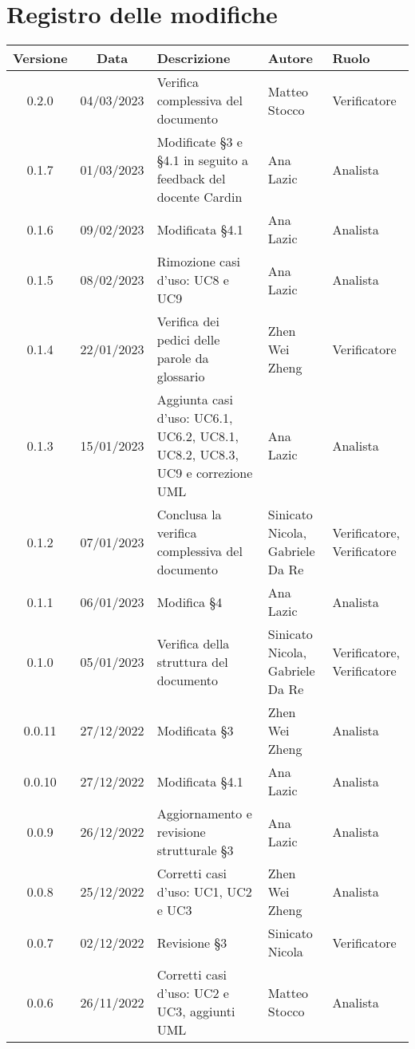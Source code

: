 \section*{Registro delle modifiche}
\begin{center}
\begin{tabularx}{\textwidth}{| c | c | X | X | X |} 
	\hline
	\rowcolor{white}
	\textbf{Versione} & \textbf{Data} & \textbf{Descrizione} & \textbf{Autore} & \textbf{Ruolo}\\
	\hline
	0.2.0 & 04/03/2023 & Verifica complessiva del documento & Matteo Stocco & Verificatore \\
 	\hline
	0.1.7 & 01/03/2023 & Modificate §3 e §4.1 in seguito a feedback del docente Cardin & Ana Lazic & Analista \\
	\hline
	0.1.6 & 09/02/2023 & Modificata §4.1 & Ana Lazic & Analista \\
 	\hline
	0.1.5 & 08/02/2023 & Rimozione casi d'uso: UC8 e UC9 & Ana Lazic & Analista \\
	\hline
	0.1.4 & 22/01/2023 & Verifica dei pedici delle parole da glossario & Zhen Wei Zheng & Verificatore \\
    \hline
    0.1.3 & 15/01/2023 & Aggiunta casi d'uso: UC6.1, UC6.2, UC8.1, UC8.2, UC8.3, UC9 e correzione UML & Ana Lazic & Analista \\
	\hline
	0.1.2 & 07/01/2023 & Conclusa la verifica complessiva del documento & Sinicato Nicola, Gabriele Da Re & Verificatore, Verificatore \\
	\hline
	0.1.1 & 06/01/2023 & Modifica §4 & Ana Lazic & Analista \\
	\hline
	0.1.0 & 05/01/2023 & Verifica della struttura del documento & Sinicato Nicola, Gabriele Da Re & Verificatore, Verificatore\\
	\hline
	0.0.11 & 27/12/2022 & Modificata §3 & Zhen Wei Zheng & Analista\\
    \hline
	0.0.10 & 27/12/2022 & Modificata §4.1 & Ana Lazic & Analista\\
    \hline
	0.0.9 & 26/12/2022 & Aggiornamento e revisione strutturale §3 & Ana Lazic & Analista\\
	\hline
	0.0.8 & 25/12/2022 & Corretti casi d'uso: UC1, UC2 e UC3 & Zhen Wei Zheng & Analista\\
	\hline
	0.0.7 & 02/12/2022 & Revisione §3 & Sinicato Nicola & Verificatore\\
	\hline
	0.0.6 & 26/11/2022 & Corretti casi d'uso: UC2 e UC3, aggiunti UML & Matteo Stocco & Analista\\

\end{tabularx}
\end{center}
